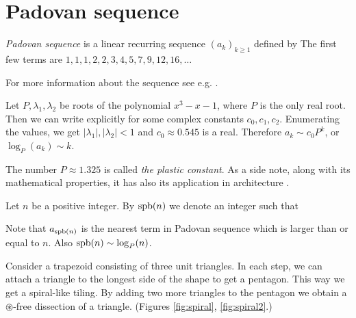 \section{Padovan sequence}

\begin{defn}
\emph{Padovan sequence} is a linear recurring sequence $(a_k)_{k \geq 1}$ defined by
%
The first few terms are $1, 1, 1, 2, 2, 3, 4, 5, 7, 9, 12, 16,\dots$
\end{defn}

For more information about the sequence see e.g. \cite{OEIS}.

Let $P, \lambda_1, \lambda_2$ be roots of the polynomial $x^3-x-1$, where $P$ is the only real root. Then we can write explicitly
%
for some complex constants $c_0,c_1,c_2$. Enumerating the values, we get $|\lambda_1|, |\lambda_2| < 1$ and $c_0 \approx 0.545$ is a real. Therefore $a_k \sim c_0P^k$, or $\log_P(a_k) \sim k$.

The number $P \approx 1.325$ is called \emph{the plastic constant}. As a side note, along with its mathematical properties, it has also its application in architecture \cite{Stewart96}.

\begin{defn}
Let $n$ be a positive integer. By $\mathop{\mathrm{spb}}(n)$ we denote an integer such that
\end{defn}

Note that $a_{\mathop{\mathrm{spb}}(n)}$ is the nearest term in Padovan sequence which is larger than or equal to $n$. Also $\mathop{\mathrm{spb}}(n) \sim \log_P(n)$.

Consider a trapezoid consisting of three unit triangles. In each step, we can attach a triangle to the longest side of the shape to get a pentagon. This way we get a spiral-like tiling. By adding two more triangles to the pentagon we obtain a $\circledast$-free dissection of a triangle. (Figures \ref{fig:spiral}, \ref{fig:spiral2}.)

